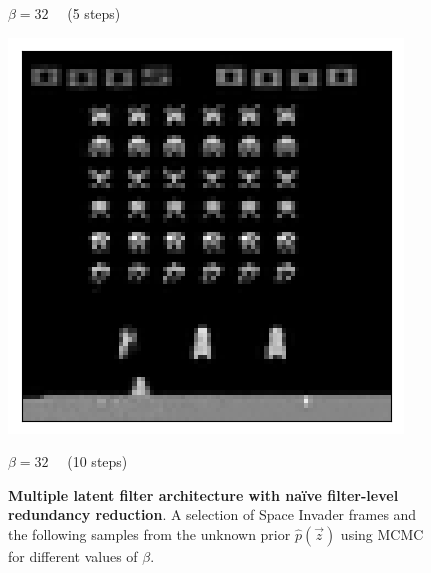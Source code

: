 \begin{figure}[h!]
\begin{multicols}{4}
    \caption{$\beta=32\quad$ (5 steps)}
    \includegraphics[scale=0.4]{figures/results/naive_average/beta_32_posterior_sample_10.png}
    \caption{$\beta=32\quad$ (10 steps)}
\end{multicols}

\caption{\textbf{Multiple latent filter architecture with na{\"i}ve filter-level redundancy reduction}. A selection of Space Invader frames and the following samples from the unknown prior $\hat{p}(\vec{z})$ using MCMC for different values of $\beta$.}
\label{fig:naive_average_originals_posterior_samples}
\end{figure}


